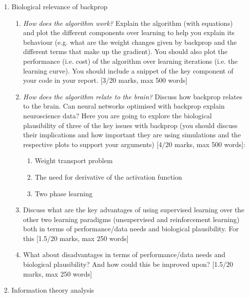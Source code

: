 \documentclass[12pt]{article}
\begin{document}
 \begin{enumerate}

 \item Biological relevance of backprop 

\begin{enumerate}
   
    \item \textsl{How does the algorithm work?} Explain the algorithm (with
      equations) and plot the different components over learning to
      help you explain its behaviour (e.g. what are the weight changes
      given by backprop and the different terms that make up the
      gradient). You should also plot the performance (i.e. cost) of
      the algorithm over learning iterations (i.e. the learning
      curve). You should include a snippet of the key component of
      your code in your report. [3/20 marks, max 500 words]

 \item \textsl{How does the algorithm relate to the brain?} Discuss how backprop
 relates to the brain. Can neural networks optimised with backprop
 explain neuroscience data? Here you are going to explore the
 biological plausibility of three of the key issues with backprop (you
 should discuss their implications and how important they are using
 simulations and the respective plots to support your arguments) [4/20
   marks, max 500 words]:
\begin{enumerate}
    \item Weight transport problem 
    \item The need for derivative of the activation function
    \item Two phase learning 
\end{enumerate}
 
\item Discuss what are the key advantages of using supervised learning over the other two learning paradigms (unsupervised and reinforcement learning) both in terms of performance/data needs and biological plausibility. For this  [1.5/20 marks, max 250 words] 

\item What about disadvantages in terms of performance/data needs and biological plausibility? And how could this be improved upon? [1.5/20 marks, max 250 words] 
\end{enumerate}
 
\item Information theory analysis 


\end{enumerate}
\end{document}
